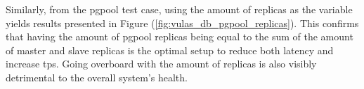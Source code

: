 \documentclass[11pt]{article}
\begin{document}
\begin{table}[h]
\caption{Transactions per seconds per test case}
\label{tab:vulas_tps}
\end{table}

\vspace{3mm}
Similarly, from the pgpool test case, using the amount of replicas as the variable yields results presented in Figure (\ref{fig:vulas_db_pgpool_replicas}). This confirms that having the amount of pgpool replicas being equal to the sum of the amount of master and slave replicas is the optimal setup to reduce both latency and increase tps. Going overboard with the amount of replicas is also visibly detrimental to the overall system's health.
\end{document}
